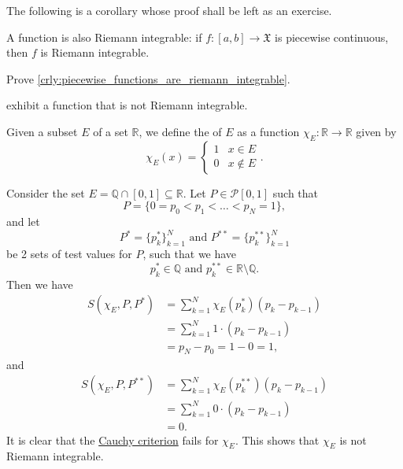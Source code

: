 \documentclass[notoc,notitlepage]{tufte-book}
\begin{document}
The following is a corollary whose proof shall be left as an exercise.

\begin{crly}\label{crly:piecewise_functions_are_riemann_integrable}
  A  function is also Riemann
  integrable: if $f : [a, b] \to \mathfrak{X}$ is piecewise continuous, then $f$ 
  is Riemann integrable.
\end{crly}

\begin{ex}
  Prove \cref{crly:piecewise_functions_are_riemann_integrable}.
\end{ex}

 exhibit a function that is not Riemann integrable.

\begin{defn}\label{defn:characteristic_function}
  Given a subset $E$ of a set $\mathbb{R}$, we define the  of $E$ as a function $\chi_E : \mathbb{R} \to \mathbb{R}$ given by
  \begin{equation*}
    \chi_E(x) = \begin{cases}
      1 & x \in E \\
      0 & x \notin E
    \end{cases}.
  \end{equation*}
\end{defn}

\begin{eg}
  Consider the set $E = \mathbb{Q} \cap [0, 1] \subseteq \mathbb{R}$. Let $P \in
  \mathcal{P}[0, 1]$ such that
  \begin{equation*}
  P = \{ 0 = p_0 < p_1 < \hdots < p_N = 1 \},
  \end{equation*}
  and let
  \begin{equation*}
    P^* = \{ p_k^* \}_{k=1}^{N} \text{ and } P^{**} = \{ p_k^{**} \}_{k=1}^{N}
  \end{equation*}
  be 2 sets of test values for $P$, such that we have
  \begin{equation*}
    p_k^* \in \mathbb{Q} \text{ and } p_k^{**} \in \mathbb{R} \setminus
    \mathbb{Q}.
  \end{equation*}
  Then we have
  \begin{align*}
    S(\chi_E, P, P^*) &= \sum_{k=1}^{N} \chi_E(p_k^*)(p_k - p_{k-1}) \\
                      &= \sum_{k=1}^{N} 1 \cdot (p_k - p_{k-1}) \\
                      &= p_N - p_0 = 1 - 0 = 1,
  \end{align*}
  and
  \begin{align*}
    S(\chi_E, P, P^{**}) &= \sum_{k=1}^{N} \chi_E(p_k^{**})(p_k - p_{k-1}) \\
                       &= \sum_{k=1}^{N} 0 \cdot (p_k - p_{k-1}) \\
                       &= 0.
  \end{align*}
  It is clear that the
  \hyperref[thm:cauchy_criterion_of_riemann_integrability]{Cauchy criterion}
  fails for $\chi_E$. This shows that $\chi_E$ is not Riemann integrable.
\end{eg}
\end{document}
